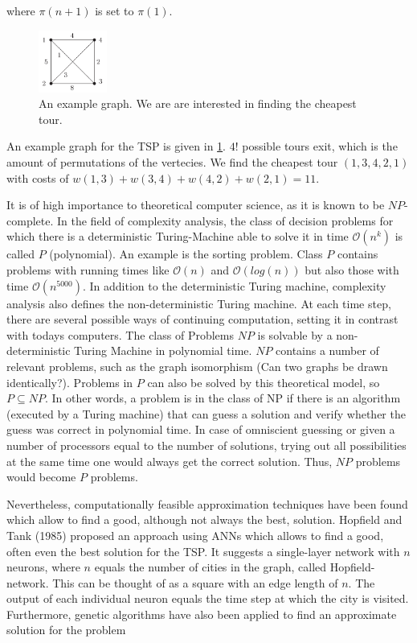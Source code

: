 \documentclass[10pt,a4paper,DIV=11]{scrreprt}
\begin{document}
where $\pi(n+1)$ is set to $\pi(1)$.\cite{MATHINF}\\

\begin{figure}[H]
    \centering
    \includegraphics[width=0.2\textwidth,scale=1]{files/tsp.png}  
    \caption{An example graph. We are are interested in finding the cheapest tour\cite{MATHINF}.}
    \label{fig:tsp}
\end{figure}

An example graph for the TSP is given in \ref{fig:tsp}. $4!$ possible tours exit, which is the amount of permutations of the vertecies.
We find the cheapest tour $(1, 3, 4, 2, 1)$ with costs of $w(1, 3) + w(3, 4) + w(4, 2) + w(2, 1) = 11$.

It is of high importance to theoretical computer science, as it is known to be $NP$-complete. In the field of complexity analysis, the class of decision problems for which there is a deterministic Turing-Machine able to solve it in time $\mathcal{O}(n^k)$ is called $P$ (polynomial). An example is the sorting problem. Class $P$ contains problems with running times like $\mathcal{O}(n)$ and $\mathcal{O}(log(n))$ but also those with time $\mathcal{O}(n^{5000})$. In addition to the deterministic Turing machine, complexity analysis also defines the non-deterministic Turing machine. At each time step, there are several possible ways of continuing computation, setting it in contrast with todays computers. The class of Problems $NP$ is solvable by a non-deterministic Turing Machine in polynomial time. $NP$ contains a number of relevant problems, such as the graph isomorphism (Can two graphs be drawn identically?). Problems in $P$ can also be solved by this theoretical model, so $P \subseteq NP$. In other words, a problem is in the class of NP if there is an algorithm (executed by a Turing machine) that can guess a solution and verify whether the guess was correct in polynomial time. In case of omniscient guessing or given a number of processors equal to the number of solutions, trying out all possibilities at the same time one would always get the correct solution. Thus, $NP$ problems would become $P$ problems. 

Nevertheless, computationally feasible approximation techniques have been found which allow to find a good, although not always the best, solution. Hopfield and Tank (1985) proposed an approach using ANNs which allows to find a good, often even the best solution for the TSP. It suggests a single-layer network with $n$ neurons, where $n$ equals the number of cities in the graph, called Hopfield-network. This can be thought of as a square with an edge length of $n$. The output of each individual neuron equals the time step at which the city is visited. Furthermore, genetic algorithms have also been applied to find an approximate solution for the problem %
\end{document}
